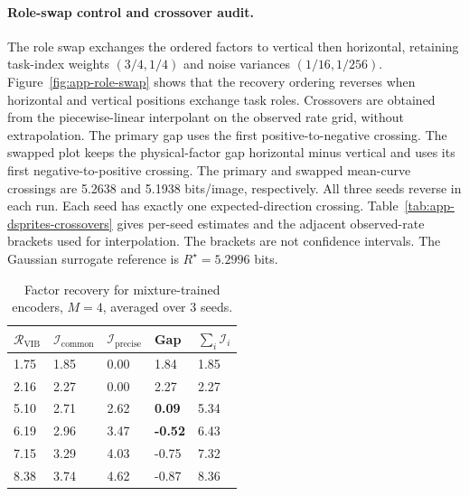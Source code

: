 \paragraph{Role-swap control and crossover audit.}
The role swap exchanges the ordered factors to vertical then horizontal,
retaining task-index weights $(3/4,1/4)$ and noise variances $(1/16,1/256)$.
Figure~\ref{fig:app-role-swap} shows that the recovery ordering reverses
when horizontal and vertical positions exchange task roles.
Crossovers are obtained from the piecewise-linear interpolant on the
observed rate grid, without extrapolation. The primary gap uses the first
positive-to-negative crossing. The swapped plot keeps the physical-factor
gap horizontal minus vertical and uses its first negative-to-positive crossing.
The primary and swapped mean-curve crossings are 5.2638 and
5.1938 bits/image, respectively. All three seeds reverse in each
run. Each seed has exactly one expected-direction crossing.
Table~\ref{tab:app-dsprites-crossovers} gives per-seed estimates and the
adjacent observed-rate brackets used for interpolation. The brackets are
not confidence intervals. The Gaussian surrogate reference is
$R^\star=5.2996$ bits.

\begin{table}
\centering
    \begin{tabular}{lllll}
        \toprule
        $\mathcal R_{\mathrm{VIB}}$ & $\mathcal I_{\mathrm{common}}$ & $\mathcal I_{\mathrm{precise}}$ & Gap & $\sum_i\mathcal I_i$ \\
        \midrule
        1.75 & 1.85 & 0.00 & 1.84 & 1.85 \\
        2.16 & 2.27 & 0.00 & 2.27 & 2.27 \\
        5.10 & 2.71 & 2.62 & \textbf{0.09} & 5.34 \\
        6.19 & 2.96 & 3.47 & \textbf{-0.52} & 6.43 \\
        7.15 & 3.29 & 4.03 & -0.75 & 7.32 \\
        8.38 & 3.74 & 4.62 & -0.87 & 8.36 \\
        \bottomrule
    \end{tabular}
    \caption{Factor recovery for mixture-trained encoders, $M = 4$, averaged over 3 seeds.}
    \label{tab:dsprites}
\end{table}

\begin{table}[t]
  \centering
  
  \caption{\textbf{Per-seed dSprites crossover audit.}
    Rates are measured variational KL bounds in bits/image. The primary
    gap crosses positive-to-negative. The role-swap physical-factor gap
    crosses negative-to-positive. Every seed has one such crossing.
    Brackets are observed neighboring grid rates, not uncertainty intervals.}
  \label{tab:app-dsprites-crossovers}
\end{table}

